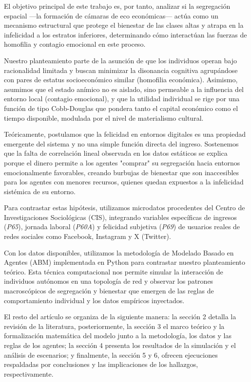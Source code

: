 \documentclass[a4paper,12pt]{article}
\begin{document}
El objetivo principal de este trabajo es, por tanto, analizar si la segregación espacial —la formación de cámaras de eco económicas— actúa como un mecanismo estructural que protege el bienestar de las clases altas y atrapa en la infelicidad a los estratos inferiores, determinando cómo interactúan las fuerzas de homofilia y contagio emocional en este proceso.

Nuestro planteamiento parte de la asunción de que los individuos operan bajo racionalidad limitada y buscan minimizar la disonancia cognitiva agrupándose con pares de estatus socioeconómico similar (homofilia económica). Asimismo, asumimos que el estado anímico no es aislado, sino permeable a la influencia del entorno local (contagio emocional), y que la utilidad individual se rige por una función de tipo Cobb-Douglas que pondera tanto el capital económico como el tiempo disponible, modulada por el nivel de materialismo cultural.

Teóricamente, postulamos que la felicidad en entornos digitales es una propiedad emergente del sistema y no una simple función directa del ingreso. Sostenemos que la falta de correlación lineal observada en los datos estáticos se explica porque el dinero permite a los agentes "comprar" su segregación hacia entornos emocionalmente favorables, creando burbujas de bienestar que son inaccesibles para los agentes con menores recursos, quienes quedan expuestos a la infelicidad sistémica de su entorno.

Para contrastar estas hipótesis, utilizamos microdatos procedentes del Centro de Investigaciones Sociológicas (CIS), integrando variables específicas de ingresos (\textit{P65}), jornada laboral (\textit{P60A}) y felicidad subjetiva (\textit{P69}) de usuarios reales de redes sociales como Facebook, Instagram y X (Twitter).

Con los datos disponibles, utilizamos la metodología de Modelado Basado en Agentes (ABM) implementada en Python para contrastar nuestro planteamiento teórico. Esta técnica computacional nos permite simular la interacción de individuos autónomos en una topología de red y observar los patrones macroscópicos de segregación y bienestar que emergen de las reglas de comportamiento individual y los datos empíricos inyectados.

El resto del artículo se organiza de la siguiente manera: la sección 2 detalla la revisión de la literatura, posteriormente, la sección 3 el marco teórico y la formalización matemática del modelo junto a la metodología, los datos y las reglas de los agentes; la sección 4 presenta los resultados de la simulación y el análisis de escenarios; y finalmente, la sección 5 y 6, ofrecen ejecuciones respaldadas por conclusiones y las implicaciones de los hallazgos, respectivamente.
\end{document}
